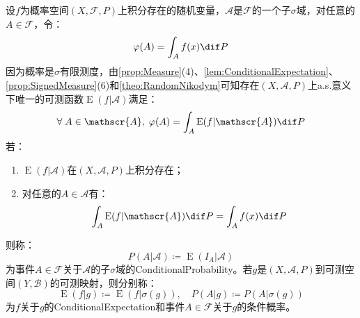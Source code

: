 \begin{definition}
	设$f$为概率空间$(X,\mathscr{F},P)$上积分存在的随机变量，$\mathscr{A}$是$\mathscr{F}$的一个子$\sigma$域，对任意的$A\in\mathscr{F}$，令：
	\begin{equation*}
		\varphi(A)=\int_{A}f(x)\dif P
	\end{equation*}
	因为概率是$\sigma$有限测度，由\cref{prop:Measure}(4)、\cref{lem:ConditionalExpectation}、\cref{prop:SignedMeasure}(6)和\cref{theo:RandomNikodym}可知存在$(X,\mathscr{A},P)$上a.s.意义下唯一的可测函数$\operatorname{E}(f|\mathscr{A})$满足：
	\begin{equation*}
		\forall\;A\in\mathscr{A},\;\varphi(A)=\int_{A}\operatorname{E}(f|\mathscr{A})\dif P
	\end{equation*}
	若：
	\begin{enumerate}
		\item $\operatorname{E}(f|\mathscr{A})$在$(X,\mathscr{A},P)$上积分存在；
		\item 对任意的$A\in\mathscr{A}$有：
		\begin{equation*}
			\int_{A}\operatorname{E}(f|\mathscr{A})\dif P=\int_{A}f(x)\dif P
		\end{equation*}
	\end{enumerate}
	则称：
	\begin{equation*}
		P(A|\mathscr{A})\coloneq\operatorname{E}(I_A|\mathscr{A})
	\end{equation*}
	为事件$A\in\mathscr{F}$关于$\mathscr{A}$的子$\sigma$域的\gls{ConditionalProbability}。若$g$是$(X,\mathscr{A},P)$到可测空间$(Y,\mathscr{B})$的可测映射，则分别称：
	\begin{equation*}
		\operatorname{E}(f|g)\coloneq\operatorname{E}(f|\sigma(g)),\quad P(A|g)\coloneq P(A|\sigma(g))
	\end{equation*}
	为$f$关于$g$的\gls{ConditionalExpectation}和事件$A\in\mathscr{F}$关于$g$的条件概率。
\end{definition}
